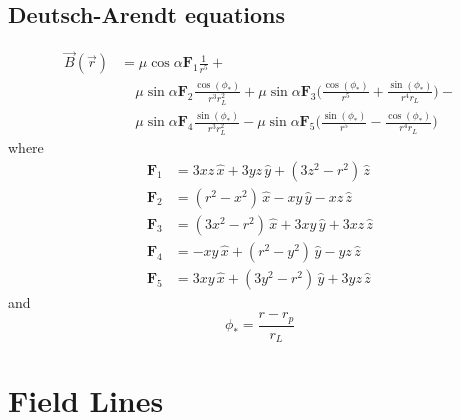 \documentclass{book}
\newcommand{\F}[1]{\bm{F}_{#1}}
\newcommand{\ph}{\phi_\ast}
\begin{document}
\subsection{Deutsch-Arendt equations}

\begin{equation}
\begin{aligned}
    \vec{B}(\vec{r}) &= \mu \cos{\alpha} \F{1} \frac{1}{r^5} + \\
                   &\hspace{13pt} \mu \sin{\alpha} \F{2} \frac{\cos(\ph)}{r^3 r_L^2} +
                                  \mu \sin{\alpha} \F{3} \bigg(\frac{\cos(\ph)}{r^5} + \frac{\sin(\ph)}{r^4 r_L}\bigg) - \\
                   &\hspace{13pt} \mu \sin{\alpha} \F{4} \frac{\sin(\ph)}{r^3 r_L^2} -
                                  \mu \sin{\alpha} \F{5} \bigg(\frac{\sin(\ph)}{r^5} - \frac{\cos(\ph)}{r^4 r_L}\bigg)
\end{aligned}
\end{equation}
where
\begin{equation}
\begin{aligned}
    \F{1} &= 3xz\,\hat{x} + 3yz\,\hat{y} + (3z^2-r^2)\,\hat{z} \\
    \F{2} &= (r^2-x^2)\,\hat{x} - xy\,\hat{y} - xz\,\hat{z} \\
    \F{3} &= (3x^2-r^2)\,\hat{x} + 3xy\,\hat{y} + 3xz\,\hat{z} \\
    \F{4} &= -xy\,\hat{x} + (r^2-y^2)\,\hat{y} - yz\,\hat{z} \\
    \F{5} &= 3xy\,\hat{x} + (3y^2-r^2)\,\hat{y} + 3yz\,\hat{z}
\end{aligned}
\end{equation}
and
\begin{equation}
    \ph = \frac{r - r_p}{r_L}
\end{equation}


\section{Field Lines}
\end{document}
